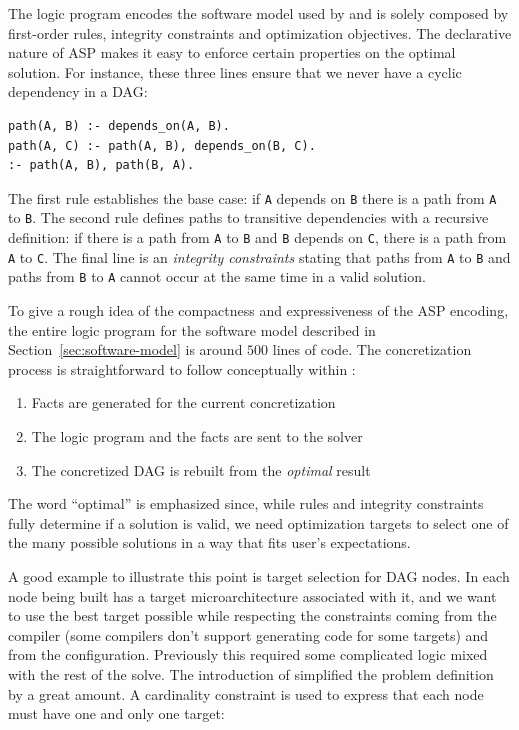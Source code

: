 The logic program encodes the software model used by \spack{}
and is solely composed by first-order rules, integrity
constraints and optimization objectives.
The declarative nature of ASP makes it easy to enforce
certain properties on the optimal solution. For instance,
these three lines ensure that we never have a cyclic dependency
in a DAG:

\begin{verbatim}
path(A, B) :- depends_on(A, B).
path(A, C) :- path(A, B), depends_on(B, C).
:- path(A, B), path(B, A).
\end{verbatim}

The first rule establishes the base case: if \texttt{A} depends
on \texttt{B} there is a path from \texttt{A} to \texttt{B}.
The second rule defines paths to transitive dependencies
with a recursive definition: if there is a path from \texttt{A}
to \texttt{B} and \texttt{B} depends on \texttt{C}, there is
a path from \texttt{A} to \texttt{C}. The final line is an
\emph{integrity constraints} stating that paths from \texttt{A}
to \texttt{B} and paths from \texttt{B} to \texttt{A} cannot
occur at the same time in a valid solution.

To give a rough idea of the compactness and expressiveness of
the ASP encoding, the entire logic program for the software
model described in Section~\ref{sec:software-model} is around
$500$ lines of code. The concretization process is straightforward
to follow conceptually within \spack:
\begin{enumerate}
\item Facts are generated for the current concretization \footnotemark
\item The logic program and the facts are sent to the solver
\item The concretized DAG is rebuilt from the \emph{optimal} result
\end{enumerate}
The word ``optimal'' is emphasized since, while rules and integrity
constraints fully determine if a solution is valid, we need
optimization targets to select one of the many possible solutions
in a way that fits user's expectations.

A good example to illustrate this point is target selection for DAG nodes.
In \spack{} each node being built has a target microarchitecture associated with it, and we want to use the best target possible while respecting the constraints coming from the compiler (some compilers don't support generating code for some targets) and from the configuration.
Previously this required some complicated logic mixed with the rest of the solve.
The introduction of \clingo{} simplified the problem definition by a great amount. A cardinality constraint is used to express that each node must have one and only one target:

